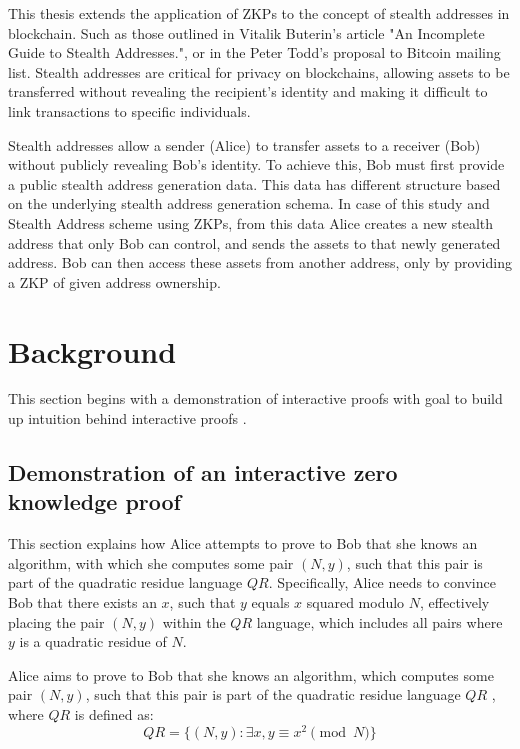 \documentclass[conference,comsoc,10pt]{IEEEtran}
\begin{document}
    This thesis extends the application of ZKPs to the concept of stealth
    addresses in blockchain. Such as those outlined in Vitalik Buterin's article "An
    Incomplete Guide to Stealth Addresses."\cite{ButerinIncompleteGuide}, or
    in the Peter Todd's proposal to Bitcoin mailing list\cite{ToddStealthAddresses}.
    Stealth addresses are critical for privacy on blockchains, allowing assets to
    be transferred without revealing the recipient's identity and making
    it difficult to link transactions to specific individuals.

    Stealth addresses allow a sender (Alice) to transfer assets to a receiver
    (Bob) without publicly revealing Bob's identity. To achieve this, Bob must
    first provide a public stealth address generation data. This data has
    different structure based on the underlying stealth address generation
    schema. In case of this study and Stealth Address scheme using ZKPs, from
    this data Alice creates a new stealth address that only Bob can control,
    and sends the assets to that newly generated address. Bob can then access
    these assets from another address, only by providing a ZKP of given address
    ownership.

\section{Background}
    This section begins with a demonstration of interactive proofs with goal to
    build up intuition behind interactive proofs \cite{Goldwasser1989,youtubeMOOCLecture1}.

    \subsection{Demonstration of an interactive zero knowledge proof}
        This section explains how Alice attempts to prove to Bob that she knows an
        algorithm, with which she computes some pair $(N, y)$, such that this pair is
        part of the quadratic residue language $QR$. Specifically, Alice needs to
        convince Bob that there exists an $x$, such that $y$ equals $x$ squared modulo $N$,
        effectively placing the pair $(N, y)$ within the $QR$ language, which includes all
        pairs where $y$ is a quadratic residue of $N$.

        Alice aims to prove to Bob that she knows an algorithm, which computes some pair $(N, y)$,
        such that this pair is part of the quadratic residue language $QR$ \cite{Goldwasser1989},
        where $QR$ is defined as:
        \[QR = \lbrace(N, y): \exists x, y \equiv x^2 \pmod{N}\rbrace\]
\end{document}
